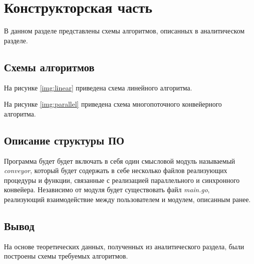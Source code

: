 \chapter{Конструкторская часть}

В данном разделе представлены схемы алгоритмов, описанных в аналитическом разделе.

\section{Схемы алгоритмов}

На рисунке \ref{img:linear} приведена схема линейного алгоритма.


\clearpage

На рисунке \ref{img:parallel} приведена схема многопоточного конвейерного алгоритма.


\section{Описание структуры ПО}
Программа будет будет включать в себя один смысловой модуль называемый \textit{conveyor}, который будет содержать в себе несколько файлов реализующих процедуры и функции, связанные с реализацией параллельного и синхронного конвейера. Независимо от модуля будет существовать файл \textit{main.go}, реализующий взаимодействие между пользователем и модулем, описанным ранее.

\section{Вывод}

На основе теоретических данных, полученных из аналитического раздела, были построены схемы требуемых алгоритмов.
